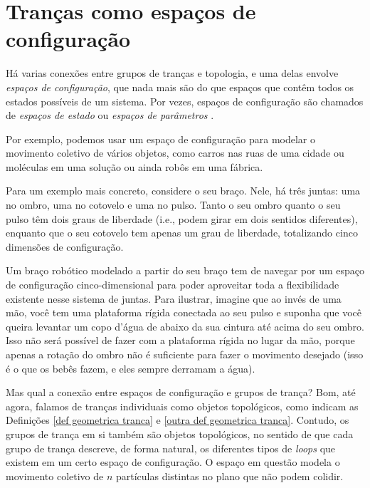 	\section{Tranças como espaços de configuração}\label{secao trancas como espacos de configuracao}
	Há varias conexões entre grupos de tranças e topologia, e uma delas envolve 
	\textit{espaços de configuração}, que nada mais são do que espaços que contêm 
	todos os estados possíveis de um sistema. Por vezes, espaços de configuração são 
	chamados de \textit{espaços de estado} ou \textit{espaços de parâmetros}
	.
	
	\par\vspace{0.3cm} Por exemplo, podemos usar um espaço de configuração para modelar o 
	movimento coletivo de vários objetos, como carros nas ruas de uma cidade ou moléculas em 
	uma solução ou ainda robôs em uma fábrica.
	
	\par\vspace{0.3cm} Para um exemplo mais concreto, considere o seu braço. Nele, há três juntas: 
	uma no ombro, uma no cotovelo e uma no pulso. Tanto o seu ombro quanto o seu pulso têm dois 
	graus de liberdade (i.e., podem girar em dois sentidos diferentes), enquanto que o seu cotovelo 
	tem apenas um grau de liberdade, totalizando cinco dimensões de configuração.
	
	\par\vspace{0.3cm} Um braço robótico modelado a partir do seu braço tem de navegar por um 
	espaço de configuração cinco-dimensional para poder aproveitar toda a flexibilidade existente 
	nesse sistema de juntas. Para ilustrar, imagine que ao invés de uma mão, você tem uma plataforma 
	rígida conectada ao seu pulso e suponha que você queira levantar um copo d'água de abaixo da sua 
	cintura até acima do seu ombro. Isso não será possível de fazer com a plataforma rígida no lugar da 
	mão, porque apenas a rotação do ombro não é suficiente para fazer o movimento desejado (isso é 
	o que os bebês fazem, e eles sempre derramam a água).
	
	\par\vspace{0.3cm} Mas qual a conexão entre espaços de configuração e grupos de trança? 
	Bom, até agora, falamos de tranças individuais como objetos topológicos, como indicam as 
	Definições \ref{def geometrica tranca} e \ref{outra def geometrica tranca}. Contudo, os grupos 
	de trança em si também são objetos topológicos, no sentido de que cada grupo de trança descreve, 
	de forma natural, os diferentes tipos de \textit{loops} que existem em um certo espaço de configuração. 
	O espaço em questão modela o movimento coletivo de $n$ partículas distintas no plano que não 
	podem colidir.
	
